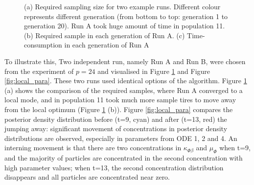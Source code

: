 \begin{figure}[ht]
    \begin{center}
    \end{center}

    \caption[Local optimum and abnormal pattern]{(a) Required sampling size for two example runs. Different colour represents different generation (from bottom to top: generation 1 to generation 20). Run A took huge amount of time in population 11. (b) Required sample in each generation of Run A. (c) Time-consumption in each generation of Run A}
    \label{fig:local_modes}
\end{figure}

To illustrate this, Two independent run, namely Run A and Run B, were chosen from the experiment of $p=24$ and visualised in Figure \ref{fig:local_modes} and Figure \ref{fig:local_para}. These two runs used identical options of the algorithm. Figure \ref{fig:local_modes} (a) shows the comparison of the required samples, where Run A converged to a local mode, and in population 11 took much more sample tires to move away from the local optimum (Figure \ref{fig:local_modes} (b)). Figure \ref{fig:local_para} compares the posterior density distribution before (t=9, cyan) and after (t=13, red) the jumping away: significant movement of concentrations in posterior density distributions are observed, especially in parameters from ODE 1, 2 and 4. An interning movement is that there are two concentrations in $\kappa_{\Phi\beta}$ and $\mu_\Phi$ when t=9, and the majority of particles are concentrated in the second concentration with high parameter values; when t=13, the second concentration distribution disappears and all particles are concentrated near zero.

